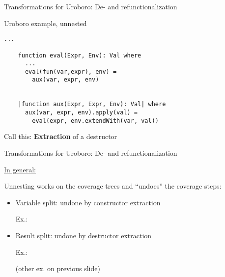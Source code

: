 \documentclass[xcolor=svgnames]{beamer}
\begin{document}
\begin{frame}[fragile]
  {Transformations for Uroboro: De- and refunctionalization}

  \begin{block}{Uroboro example, unnested}
    \begin{lstlisting}[style=base, gobble=4]
    ...

    function eval(Expr, Env): Val where
      ...
      eval(fun(var,expr), env) =
        aux(var, expr, env)
        

    |function aux(Expr, Expr, Env): Val| where
      aux(var, expr, env).apply(val) =
        eval(expr, env.extendWith(var, val))
    \end{lstlisting}
  \end{block}

  Call this: \textbf{Extraction} of a destructor
\end{frame}

\begin{frame}
  {Transformations for Uroboro: De- and refunctionalization}

\underline{In general:}

Unnesting works on the coverage trees and ``undoes'' the coverage steps:
\begin{itemize}
\item Variable split: undone by constructor extraction

Ex.:


\item Result split: undone by destructor extraction

Ex.:


(other ex. on previous slide)
\end{itemize}

\end{frame}
\end{document}
